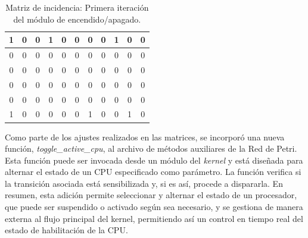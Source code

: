 \begin{table}[H]
    \centering
    \begin{tabular}{|c|c|c|c|c|c|c|c|c|c|c|}
        \hline
        1                      & 0                      & 0                      & 1                      & 0                      & 0                      & 0                      & 0                      & 1                      & \cellcolor{lightgray}0 & \cellcolor{lightgray}0 \\
        \hline
        0                      & 0                      & 0                      & 0                      & 0                      & 0                      & 0                      & 0                      & 0                      & \cellcolor{lightgray}0 & \cellcolor{lightgray}0 \\
        \hline
        0                      & 0                      & 0                      & 0                      & 0                      & 0                      & 0                      & 0                      & 0                      & \cellcolor{lightgray}0 & \cellcolor{lightgray}0 \\
        \hline
        0                      & 0                      & 0                      & 0                      & 0                      & 0                      & 0                      & 0                      & 0                      & \cellcolor{lightgray}0 & \cellcolor{lightgray}0 \\
        \hline
        0                      & 0                      & 0                      & 0                      & 0                      & 0                      & 0                      & 0                      & 0                      & \cellcolor{lightgray}0 & \cellcolor{lightgray}0 \\
        \hline
        \cellcolor{lightgray}1 & \cellcolor{lightgray}0 & \cellcolor{lightgray}0 & \cellcolor{lightgray}0 & \cellcolor{lightgray}0 & \cellcolor{lightgray}0 & \cellcolor{lightgray}1 & \cellcolor{lightgray}0 & \cellcolor{lightgray}0 & \cellcolor{lightgray}1 & \cellcolor{lightgray}0 \\
        \hline
    \end{tabular}
    \caption{Matriz de incidencia: Primera iteración del módulo de encendido/apagado.}
    \label{tabla:matriz_incidencia_post}
\end{table}

Como parte de los ajustes realizados en las matrices, se incorporó una nueva función, \textit{toggle\_active\_cpu}, al archivo de métodos auxiliares de la Red de Petri. Esta función puede ser invocada desde un módulo del \textit{kernel} y está diseñada para alternar el estado de un CPU especificado como parámetro. La función verifica si la transición asociada está sensibilizada y, si es así, procede a dispararla. En resumen, esta adición permite seleccionar y alternar el estado de un procesador, que puede ser suspendido o activado según sea necesario, y se gestiona de manera externa al flujo principal del kernel, permitiendo así un control en tiempo real del estado de habilitación de la CPU.\par

